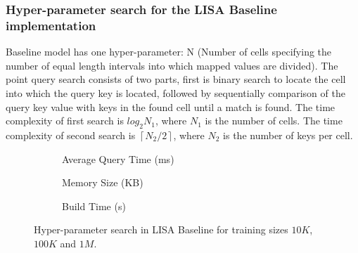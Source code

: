 \subsubsection {Hyper-parameter search for the LISA Baseline implementation}
Baseline model has one hyper-parameter: N (Number of cells specifying the number of equal length intervals into which mapped values are divided). The point query search consists of two parts, first is binary search to locate the cell into which the query key is located, followed by sequentially comparison of the query key value with keys in the found cell until a match is found. The time complexity of first search is $log_{2}N_{1}$, where $N_{1}$ is the number of cells. The time complexity of second search is  $ \left \lceil {N_{2} / 2}\right \rceil $, where $N_{2}$ is the number of keys per cell.  

\begin{figure}
 \centering
     \begin{subfigure}[b]{0.32\textwidth}
         \centering
         
         \caption{Average Query Time (ms)}
         \label{fig:2d_exp3_1_1}
     \end{subfigure}
     \hfill
     \begin{subfigure}[b]{0.32\textwidth}
         \centering
         
         \caption{Memory Size (KB)}
         \label{fig:2d_exp3_1_2}
     \end{subfigure}
     \hfill
     \begin{subfigure}[b]{0.32\textwidth}
         \centering
         
         \caption{Build Time (s)}
         \label{fig:2d_exp3_1_3}
     \end{subfigure}
     \hfill
     \caption{Hyper-parameter search in LISA Baseline for training sizes $10K$, $100K$ and $1M$.}
     \label{fig:LISA_Baseline_Hyperparameter_Search}
\end{figure}


